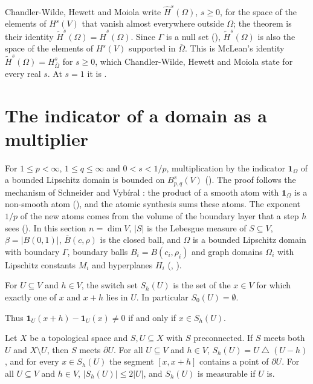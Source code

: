 Chandler-Wilde, Hewett and Moiola write $\hat H^s(\Omega)$, $s \geq 0$, for the space of the
elements of $H^s(V)$ that vanish almost everywhere outside $\Omega$; the theorem is their
identity $\tilde H^s(\Omega) = \hat H^s(\Omega)$. Since $\Gamma$ is a null set
(), $\tilde H^s(\Omega)$ is also the space of the elements of $H^s(V)$
supported in $\overline\Omega$. This is McLean's identity
$\tilde H^s(\Omega) = H^s_{\overline\Omega}$ for $s \geq 0$, which Chandler-Wilde, Hewett and
Moiola state for every real $s$. At $s = 1$ it is .

\section{The indicator of a domain as a multiplier}
\label{sec:indicator-multiplier}

For $1 \leq p < \infty$, $1 \leq q \leq \infty$ and $0 < s < 1/p$, multiplication by the
indicator $\mathbf 1_\Omega$ of a bounded Lipschitz domain is bounded on $B^s_{p,q}(V)$
(). The proof follows the mechanism of Schneider and Vybíral
\cite[Theorem 5.4(i)]{SchneiderVybiral}: the product of a smooth atom with $\mathbf 1_\Omega$ is
a non-smooth atom (), and the atomic synthesis sums these atoms. The
exponent $1/p$ of the new atoms comes from the volume of the boundary layer that a step $h$ sees
(). In this section $n = \dim V$, $|S|$ is the Lebesgue measure
of $S \subseteq V$, $\beta = |B(0, 1)|$, $\overline B(c, \rho)$ is the closed ball, and $\Omega$
is a bounded Lipschitz domain with boundary $\Gamma$, boundary balls $B_i = B(c_i, \rho_i)$ and
graph domains $\Omega_i$ with Lipschitz constants $M_i$ and hyperplanes $H_i$
(, ).

\begin{definition}
\label{def:switch-set}
\leanok
For $U \subseteq V$ and $h \in V$, the switch set $S_h(U)$ is the set of the $x \in V$ for which
exactly one of $x$ and $x + h$ lies in $U$. In particular $S_0(U) = \emptyset$.
\end{definition}

Thus $\mathbf 1_U(x + h) - \mathbf 1_U(x) \neq 0$ if and only if $x \in S_h(U)$.

\begin{lemma}
\label{lem:switch-set-crossing}
\leanok
{}
Let $X$ be a topological space and $S, U \subseteq X$ with $S$ preconnected. If $S$ meets both $U$
and $X \setminus U$, then $S$ meets $\partial U$. For all $U \subseteq V$ and $h \in V$,
$S_h(U) = U \mathbin{\triangle} (U - h)$, and for every $x \in S_h(U)$ the segment
$[x, x + h]$ contains a point of $\partial U$. For all $U \subseteq V$ and $h \in V$,
$|S_h(U)| \leq 2 |U|$, and $S_h(U)$ is measurable if $U$ is.
\end{lemma}

